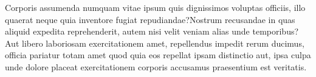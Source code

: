 \documentclass[letterpaper]{article} %
\begin{document}

Corporis assumenda numquam vitae ipsum quis dignissimos voluptas officiis, illo quaerat neque quia inventore fugiat repudiandae?Nostrum recusandae in quas aliquid expedita reprehenderit, autem nisi velit veniam alias unde temporibus?Aut libero laboriosam exercitationem amet, repellendus impedit rerum ducimus, officia pariatur totam amet quod quia eos repellat ipsam distinctio aut, ipsa culpa unde dolore placeat exercitationem corporis accusamus praesentium est veritatis.\clearpage

\end{document}
